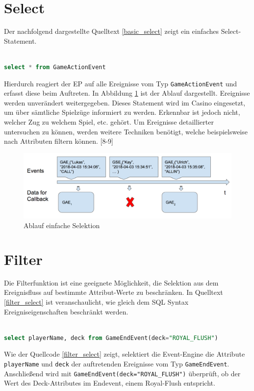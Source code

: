 \section{Select}

Der nachfolgend dargestellte Quelltext \ref{basic_select} zeigt ein einfaches Select-Statement.
\begin{lstlisting}[caption={Statement einfache Selektion},label=basic_select,captionpos=b,language=SQL]

select * from GameActionEvent

\end{lstlisting}
Hierdurch reagiert der \acf{EP} auf alle Ereignisse vom Typ \texttt{GameActionEvent} und  erfasst diese beim Auftreten. 
In Abbildung \ref{basic_select_img} ist der Ablauf dargestellt. Ereignisse werden unverändert weitergegeben. Dieses Statement wird im Casino eingesetzt, um über sämtliche Spielzüge informiert zu werden. Erkennbar ist jedoch nicht, welcher Zug zu welchem Spiel, etc. gehört. Um Ereignisse detaillierter untersuchen zu können, werden weitere Techniken benötigt, welche beispielsweise nach Attributen filtern können.
\cite{EsperRef2018}[8-9]

\begin{figure}[h]
	\centering
	\includegraphics[width=\textwidth,height=\textheight, keepaspectratio]{images/statement_basic_select.png}
	\caption{Ablauf einfache Selektion}
	\label{basic_select_img}
\end{figure}

\section{Filter}

Die Filterfunktion ist eine geeignete Möglichkeit, die Selektion aus dem Ereignisfluss auf bestimmte Attribut-Werte zu beschränken. In Quelltext \ref{filter_select} ist veranschaulicht, wie gleich dem SQL Syntax Ereigniseigenschaften beschränkt werden.
\begin{lstlisting}[caption={Statement mit Filter},label=filter_select,captionpos=b,language=SQL]

select playerName, deck from GameEndEvent(deck="ROYAL_FLUSH")

\end{lstlisting}
Wie der Quellcode \ref{filter_select} zeigt, selektiert die Event-Engine die Attribute \texttt{playerName} und \texttt{deck} der auftretenden Ereignisse vom Typ \texttt{GameEndEvent}. Anschließend wird mit \texttt{GameEndEvent(deck="ROYAL\_FLUSH")} überprüft, ob der Wert des Deck-Attributes im Endevent, einem Royal-Flush entspricht.

